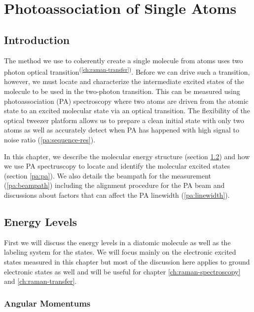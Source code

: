 
\chapter{Photoassociation of Single Atoms}
\label{ch:pa}

\section{Introduction}

The method we use to coherently create a single molecule from atoms
uses two photon optical transition\textsuperscript{(\ref{ch:raman-transfer})}.
Before we can drive such a transition, however, we must locate and characterize
the intermediate excited states of the molecule to be used in the two-photon transition.
This can be measured using photoassociation (PA) spectroscopy
where two atoms are driven from the atomic state to an excited molecular state
via an optical transition.
The flexibility of the optical tweezer platform allows us to
prepare a clean initial state with only two atoms
as well as accurately detect when PA has happened
with high signal to noise ratio (\ref{pa:sequence-res}).

In this chapter, we describe the molecular energy structure (section \ref{pa:structure})
and how we use PA spectruscopy to locate and identify the molecular excited states
(section \ref{pa:pa}).
We also details the beampath for the measurement (\ref{pa:beampath}) including
the alignment procedure for the PA beam and discussions about factors that can affect
the PA linewidth (\ref{pa:linewidth}).

\section{Energy Levels}
\label{pa:structure}

First we will discuss the energy levels in a diatomic molecule
as well as the labeling system for the states.
We will focus mainly on the electronic excited states measured in this chapter
but most of the discussion here applies to ground electronic states as well
and will be useful for chapter \ref{ch:raman-spectroscopy} and \ref{ch:raman-transfer}.

\subsection{Angular Momentums}

